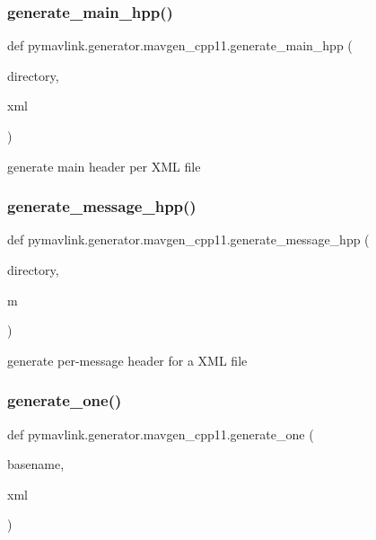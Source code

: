 \subsubsection{\texorpdfstring{generate\+\_\+main\+\_\+hpp()}{generate\_main\_hpp()}}
{\footnotesize\ttfamily def pymavlink.\+generator.\+mavgen\+\_\+cpp11.\+generate\+\_\+main\+\_\+hpp (\begin{DoxyParamCaption}\item[{}]{directory,  }\item[{}]{xml }\end{DoxyParamCaption})}

\begin{DoxyVerb}generate main header per XML file\end{DoxyVerb}
 \mbox{\label{namespacepymavlink_1_1generator_1_1mavgen__cpp11_a45ff369d71421e11a26c7a69c2f8de6c}} 
\subsubsection{\texorpdfstring{generate\+\_\+message\+\_\+hpp()}{generate\_message\_hpp()}}
{\footnotesize\ttfamily def pymavlink.\+generator.\+mavgen\+\_\+cpp11.\+generate\+\_\+message\+\_\+hpp (\begin{DoxyParamCaption}\item[{}]{directory,  }\item[{}]{m }\end{DoxyParamCaption})}

\begin{DoxyVerb}generate per-message header for a XML file\end{DoxyVerb}
 \mbox{\label{namespacepymavlink_1_1generator_1_1mavgen__cpp11_a64628a652f5243b623280750d9655f7e}} 
\subsubsection{\texorpdfstring{generate\+\_\+one()}{generate\_one()}}
{\footnotesize\ttfamily def pymavlink.\+generator.\+mavgen\+\_\+cpp11.\+generate\+\_\+one (\begin{DoxyParamCaption}\item[{}]{basename,  }\item[{}]{xml }\end{DoxyParamCaption})}

